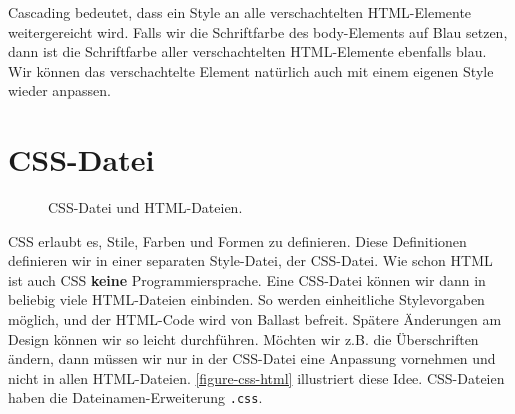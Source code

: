 
\eineWebseiteMitCssStylenLernziele

\begin{hinweis}
Cascading bedeutet, dass ein Style an alle verschachtelten HTML-Elemente weitergereicht wird. Falls wir die Schriftfarbe des body-Elements auf Blau setzen, dann ist die Schriftfarbe aller verschachtelten HTML-Elemente ebenfalls blau. Wir können das verschachtelte Element natürlich auch mit einem eigenen Style wieder anpassen.
\end{hinweis}

\section{\acs{CSS}-Datei}

\begin{wrapfigure}[10]{r}{4.5cm}
\vspace{-20pt}
\centering
{}
\caption{\ac{CSS}-Datei und \ac{HTML}-Dateien.}
\label{figure-css-html}
\end{wrapfigure}

\ac{CSS} erlaubt es, Stile, Farben und Formen zu definieren. Diese Definitionen definieren wir in einer separaten Style-Datei, der \ac{CSS}-Datei. Wie schon \ac{HTML} ist auch \ac{CSS} \textbf{keine} Programmiersprache. Eine \ac{CSS}-Datei können wir dann in beliebig viele \ac{HTML}-Dateien einbinden. So werden einheitliche Stylevorgaben möglich, und der \ac{HTML}-Code wird von Ballast befreit. Spätere Änderungen am Design können wir so leicht durchführen. Möchten wir z.B. die Überschriften ändern, dann müssen wir nur in der \ac{CSS}-Datei eine Anpassung vornehmen und nicht in allen \ac{HTML}-Dateien. \autoref{figure-css-html} illustriert diese Idee. \ac{CSS}-Dateien haben die Dateinamen-Erweiterung \texttt{.css}.

